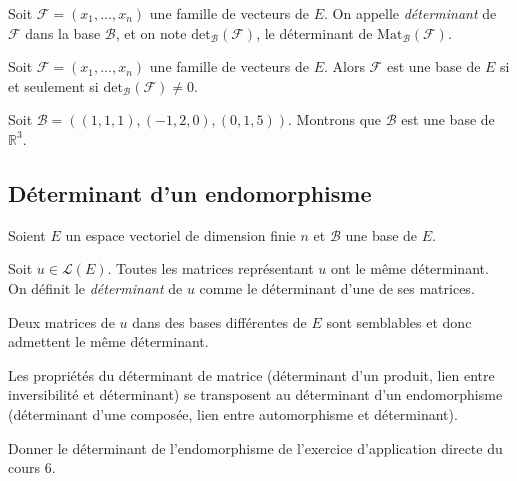 \documentclass[a4paper,10pt]{report}
\begin{document}
\begin{defin} Soit $\mathcal{F} = (x_1, \ldots, x_n)$ une famille de vecteurs de $E$. On appelle \textit{déterminant} de $\mathcal{F}$ dans la base $\mathcal{B}$, et on note $\textrm{det}_{\mathcal{B}}(\mathcal{F})$, le déterminant de $\textrm{Mat}_{\mathcal{B}}(\mathcal{F})$.
\end{defin}

\begin{prop} Soit $\mathcal{F} = (x_1, \ldots, x_n)$ une famille de vecteurs de $E$. Alors $\mathcal{F}$ est une base de $E$ si et seulement si \newline $\textrm{det}_{\mathcal{B}}(\mathcal{F}) \neq 0$.
\end{prop}

\begin{ex} Soit $\mathcal{B}=((1,1,1), (-1,2,0), (0,1,5))$. Montrons que $\mathcal{B}$ est une base de $\mathbb{R}^3$.

\vspace{5.5cm}
\end{ex}

\subsection{Déterminant d'un endomorphisme}

\noindent Soient $E$ un espace vectoriel de dimension finie $n$ et $\mathcal{B}$ une base de $E$.

\begin{defip} Soit $u \in \mathcal{L}(E)$. Toutes les matrices représentant $u$ ont le même déterminant. On définit le \textit{déterminant} de $u$ comme le déterminant d'une de ses matrices.
\end{defip}

\begin{preuve} Deux matrices de $u$ dans des bases différentes de $E$ sont semblables et donc admettent le même déterminant.
\end{preuve}

\medskip


\begin{prop} Les propriétés du déterminant de matrice (déterminant d'un produit, lien entre inversibilité et déterminant) se transposent au déterminant d'un endomorphisme (déterminant d'une composée, lien entre automorphisme et déterminant).
\end{prop} 

\begin{exa} Donner le déterminant de l'endomorphisme de l'exercice d'application directe du cours $6$.
\end{exa}
\end{document}
